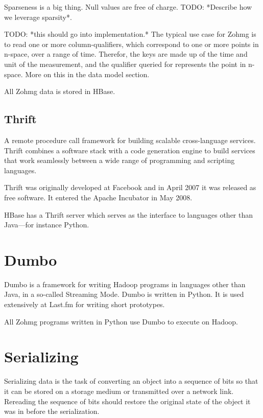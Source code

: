 \documentclass[a4paper,10pt]{book}
\begin{document}
Sparseness is a big thing. Null values are free of charge. TODO: *Describe
how we leverage sparsity*.

TODO: *this should go into implementation.*
The typical use case for Zohmg is to read one or more column-qualifiers,
which correspond to one or more points in n-space, over a range of time.
Therefor, the keys are made up of the time and unit of the measurement,
and the qualifier queried for represents the point in n-space. More on
this in the data model section.

All Zohmg data is stored in HBase.


\subsection{Thrift}

A remote procedure call framework for building scalable cross-language
services. Thrift combines a software stack with a code generation engine to
build services that work seamlessly between a wide range of programming and
scripting languages. \cite{thrift}

Thrift was originally developed at Facebook and in April 2007 it was
released as free software. It entered the Apache Incubator in May 2008.

HBase has a Thrift server which serves as the interface to languages other
than Java---for instance Python.



\section{Dumbo}

Dumbo is a framework for writing Hadoop programs in languages other than
Java, in a so-called Streaming Mode. Dumbo is written in Python. It is used
extensively at Last.fm for writing short prototypes. \cite{dumbo}

All Zohmg programs written in Python use Dumbo to execute on Hadoop.


\section{Serializing}

Serializing data is the task of converting an object into a sequence of
bits so that it can be stored on a storage medium or transmitted over a
network link. Rereading the sequence of bits should restore the original
state of the object it was in before the serialization.
\end{document}
